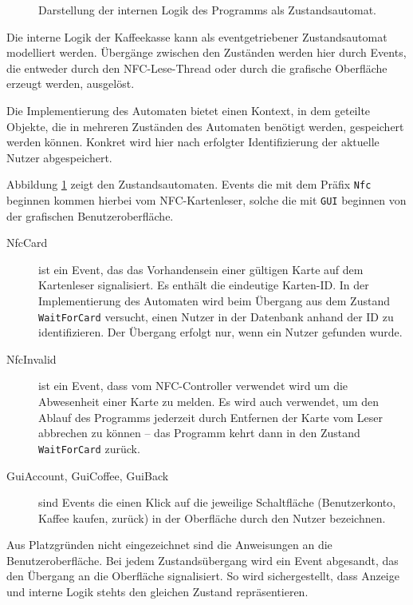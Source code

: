 \documentclass[11pt,a4paper]{IEEEtran}
\begin{document}
\begin{figure}[ht!]
    \centering
    
    \caption{Darstellung der internen Logik des Programms als Zustandsautomat.}
    \label{fig:statemachine}
\end{figure}

Die interne Logik der Kaffeekasse kann als eventgetriebener Zustandsautomat 
modelliert werden. Übergänge zwischen den Zuständen werden hier durch Events,
die entweder durch den NFC-Lese-Thread oder durch die grafische Oberfläche
erzeugt werden, ausgelöst. 

Die Implementierung des Automaten bietet einen Kontext, in dem geteilte
Objekte, die in mehreren Zuständen des Automaten benötigt werden, gespeichert 
werden können. Konkret wird hier nach erfolgter Identifizierung der aktuelle
Nutzer abgespeichert.

Abbildung \ref{fig:statemachine} zeigt den Zustandsautomaten. Events die
mit dem Präfix \texttt{Nfc} beginnen kommen hierbei vom NFC-Kartenleser, solche
die mit \texttt{GUI} beginnen von der grafischen Benutzeroberfläche. 

\begin{description}
    \item[NfcCard] ist ein Event, das das Vorhandensein einer gültigen
        Karte auf dem Kartenleser signalisiert. Es enthält die eindeutige 
        Karten-ID. In der Implementierung des Automaten wird beim Übergang aus
        dem Zustand \texttt{WaitForCard} versucht, einen Nutzer in der
        Datenbank anhand der ID zu identifizieren. Der Übergang erfolgt nur,
        wenn ein Nutzer gefunden wurde.
    \item[NfcInvalid] ist ein Event, dass vom NFC-Controller verwendet wird
        um die Abwesenheit einer Karte zu melden. Es wird auch verwendet, um 
        den Ablauf des Programms jederzeit durch Entfernen der Karte vom Leser
        abbrechen zu können -- das Programm kehrt dann in den Zustand
        \texttt{WaitForCard} zurück.
    \item[GuiAccount, GuiCoffee, GuiBack] sind Events die einen Klick auf die
        jeweilige Schaltfläche (Benutzerkonto, Kaffee kaufen, zurück) in der 
        Oberfläche durch den Nutzer bezeichnen.
\end{description}

Aus Platzgründen nicht eingezeichnet sind die Anweisungen an die
Benutzeroberfläche. Bei jedem Zustandsübergang wird ein Event abgesandt, das 
den Übergang an die Oberfläche signalisiert. So wird sichergestellt, dass
Anzeige und interne Logik stehts den gleichen Zustand repräsentieren.
\end{document}
